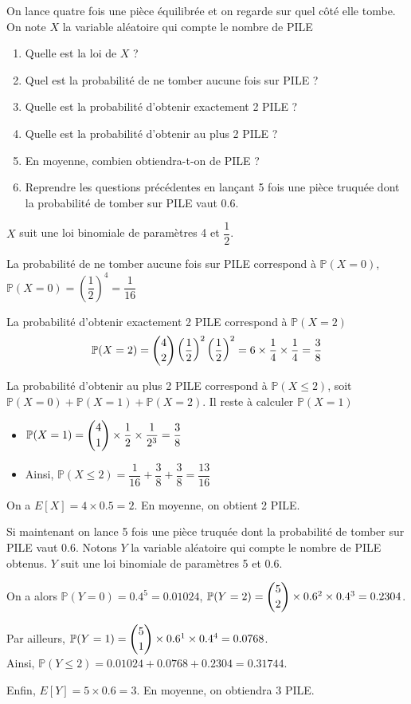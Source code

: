 \documentclass[11pt,fleqn, openany]{book} %
\begin{document}
\begin{exercise}
On lance quatre fois une pièce équilibrée et on regarde sur quel côté elle tombe. On note $X$ la variable aléatoire qui compte le nombre de PILE
\begin{enumerate}
\item Quelle est la loi de $X$ ?
\item Quel est la probabilité de ne tomber aucune fois sur PILE ?
\item Quelle est la probabilité d'obtenir exactement 2 PILE ?
\item Quelle est la probabilité d'obtenir au plus 2 PILE ?
\item En moyenne, combien obtiendra-t-on de PILE ?
\item Reprendre les questions précédentes en lançant 5 fois une pièce truquée dont la probabilité de tomber sur PILE vaut 0.6.
\end{enumerate}\end{exercise}

\begin{solution}$X$ suit une loi binomiale de paramètres 4 et $\dfrac{1}{2}$. 

La probabilité de ne tomber aucune fois sur PILE correspond à $\mathbb{P}(X=0)$, $\mathbb{P}(X=0)= \left(	\dfrac{1}{2}\right)^4 = \dfrac{1}{16}$

La probabilité d'obtenir exactement 2 PILE correspond à $\mathbb{P}(X=2)$
\[ \mathbb{P}(X=2) = \dbinom{4}{2} \left( \dfrac{1}{2}\right)^2 \left( \dfrac{1}{2}\right)^2=6 \times  \dfrac{1}{4} \times \dfrac{1}{4}=\dfrac{3}{8}\]

 La probabilité d'obtenir au plus 2 PILE correspond à $\mathbb{P}(X \leqslant 2)$, soit $\mathbb{P}(X=0)+\mathbb{P}(X=1)+\mathbb{P}(X=2)$. Il reste à calculer $\mathbb{P}(X=1)$
\begin{itemize}
\item $\mathbb{P}(X=1)= \dbinom{4}{1} \times \dfrac{1}{2} \times \dfrac{1}{2^3}=\dfrac{3}{8}$
\item Ainsi, $\mathbb{P}(X \leqslant 2)=\dfrac{1}{16}+\dfrac{3}{8}+\dfrac{3}{8}=\dfrac{13}{16}$
\end{itemize}

On a $E[X]=4 \times 0.5=2$. En moyenne, on obtient 2 PILE.

Si maintenant on lance 5 fois une pièce truquée dont la probabilité de tomber sur PILE vaut 0.6. Notons $Y$ la variable aléatoire qui compte le nombre de PILE obtenus. $Y$ suit une loi binomiale de paramètres 5 et 0.6. 

On a alors $\mathbb{P}(Y=0)=0.4^5=0.01024$, $\mathbb{P}(Y=2)= \dbinom{5}{2} \times 0.6^2\times 0.4^3=0.2304$.

Par ailleurs, $\mathbb{P}(Y=1)=\dbinom{5}{1} \times 0.6^1 \times 0.4^4 =0.0768$. \\Ainsi, $\mathbb{P}(Y \leqslant 2)=0.01024 + 0.0768+0.2304 =0.31744$.

Enfin, $E[Y]=5 \times 0.6 = 3$. En moyenne, on obtiendra 3 PILE. 
\end{solution}
\end{document}

